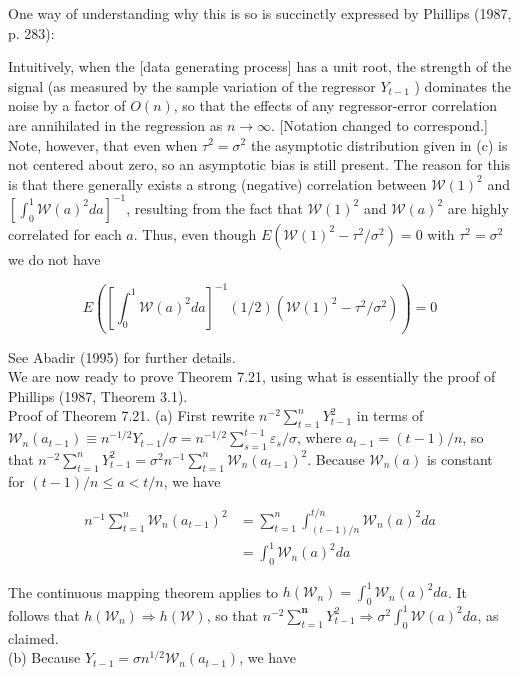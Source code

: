 \documentclass[10pt]{article}
\begin{document}
One way of understanding why this is so is succinctly expressed by Phillips (1987, p. 283):

Intuitively, when the [data generating process] has a unit root, the strength of the signal (as measured by the sample variation of the regressor $Y_{t-1}$ ) dominates the noise by a factor of $O(n)$, so that the effects of any regressor-error correlation are annihilated in the regression as $n \rightarrow \infty$. [Notation changed to correspond.]\\
Note, however, that even when $\tau^{2}=\sigma^{2}$ the asymptotic distribution given in (c) is not centered about zero, so an asymptotic bias is still present. The reason for this is that there generally exists a strong (negative) correlation between $\mathcal{W}(1)^{2}$ and $\left[\int_{0}^{1} \mathcal{W}(a)^{2} d a\right]^{-1}$, resulting from the fact that $\mathcal{W}(1)^{2}$ and $\mathcal{W}(a)^{2}$ are highly correlated for each $a$. Thus, even though $E\left(\mathcal{W}(1)^{2}-\right. \left.\tau^{2} / \sigma^{2}\right)=0$ with $\tau^{2}=\sigma^{2}$ we do not have

$$
E\left(\left[\int_{0}^{1} \mathcal{W}(a)^{2} d a\right]^{-1}(1 / 2)\left(\mathcal{W}(1)^{2}-\tau^{2} / \sigma^{2}\right)\right)=0
$$

See Abadir (1995) for further details.\\
We are now ready to prove Theorem 7.21, using what is essentially the proof of Phillips (1987, Theorem 3.1).\\
Proof of Theorem 7.21. (a) First rewrite $n^{-2} \sum_{t=1}^{n} Y_{t-1}^{2}$ in terms of $\mathcal{W}_{n}\left(a_{t-1}\right) \equiv n^{-1 / 2} Y_{t-1} / \sigma=n^{-1 / 2} \sum_{s=1}^{t-1} \varepsilon_{s} / \sigma$, where $a_{t-1}=(t-1) / n$, so that $n^{-2} \sum_{t=1}^{n} Y_{t-1}^{2}=\sigma^{2} n^{-1} \sum_{t=1}^{n} \mathcal{W}_{n}\left(a_{t-1}\right)^{2}$. Because $\mathcal{W}_{n}(a)$ is constant for $(t-1) / n \leq a<t / n$, we have

$$
\begin{aligned}
n^{-1} \sum_{t=1}^{n} \mathcal{W}_{n}\left(a_{t-1}\right)^{2} & =\sum_{t=1}^{n} \int_{(t-1) / n}^{t / n} \mathcal{W}_{n}(a)^{2} d a \\
& =\int_{0}^{1} \mathcal{W}_{n}(a)^{2} d a
\end{aligned}
$$

The continuous mapping theorem applies to $h\left(\mathcal{W}_{n}\right)=\int_{0}^{1} \mathcal{W}_{n}(a)^{2} d a$. It follows that $h\left(\mathcal{W}_{n}\right) \Rightarrow h(\mathcal{W})$, so that $n^{-2} \sum_{t=1}^{\boldsymbol{n}} Y_{t-1}^{2} \Rightarrow \sigma^{2} \int_{0}^{1} \mathcal{W}(a)^{2} d a$, as claimed.\\
(b) Because $Y_{t-1}=\sigma n^{1 / 2} \mathcal{W}_{n}\left(a_{t-1}\right)$, we have
\end{document}

